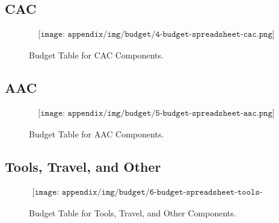 \begin{landscape}
\subsection{CAC}
\begin{figure}[H]
    \begin{align*}
        \texttt{[image: appendix/img/budget/4-budget-spreadsheet-cac.png]}
    \end{align*}
    \caption{Budget Table for CAC Components.}
    \label{fig:budget-table-for-structure-components}
\end{figure}
\end{landscape}


\begin{landscape}
\subsection{AAC}
\begin{figure}[H]
    \begin{align*}
        \texttt{[image: appendix/img/budget/5-budget-spreadsheet-aac.png]}
    \end{align*}
    \caption{Budget Table for AAC Components.}
    \label{fig:budget-table-for-aac-components}
\end{figure}
\end{landscape}

\begin{landscape}
\subsection{Tools, Travel, and Other}
\begin{figure}[H]
    \begin{align*}
        \texttt{[image: appendix/img/budget/6-budget-spreadsheet-tools-travel-other.png]}
    \end{align*}
    \caption{Budget Table for Tools, Travel, and Other Components.}
    \label{fig:budget-table-for-tools-travel-other-components}
\end{figure}
\end{landscape}